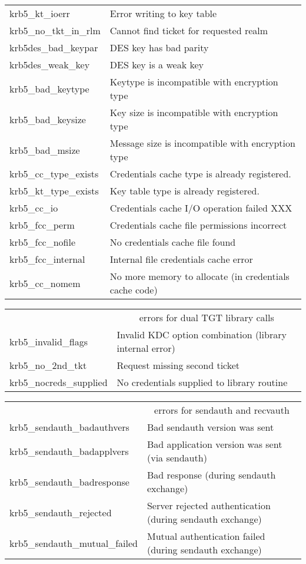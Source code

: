 \begin{small}
\begin{tabular}{ll}
{\sc krb5_kt_ioerr }&	 Error writing to key table \\
{\sc krb5_no_tkt_in_rlm }&	 Cannot find ticket for requested realm \\
{\sc krb5des_bad_keypar }&	 DES key has bad parity \\
{\sc krb5des_weak_key }&	 DES key is a weak key \\
{\sc krb5_bad_keytype }&	 Keytype is incompatible with encryption type \\
{\sc krb5_bad_keysize }&	 Key size is incompatible with encryption type \\
{\sc krb5_bad_msize }&	 Message size is incompatible with encryption type \\
{\sc krb5_cc_type_exists }&	 Credentials cache type is already registered. \\
{\sc krb5_kt_type_exists }&	 Key table type is already registered. \\
{\sc krb5_cc_io }&		 Credentials cache I/O operation failed XXX \\
{\sc krb5_fcc_perm }&	 Credentials cache file permissions incorrect \\
{\sc krb5_fcc_nofile }&	 No credentials cache file found \\
{\sc krb5_fcc_internal }&	 Internal file credentials cache error \\
{\sc krb5_cc_nomem }& No more memory to allocate (in credentials cache code) \\ 

\end{tabular}

\begin{tabular}{ll}
& \multicolumn{1}{c}{errors for dual TGT library calls} \\

{\sc krb5_invalid_flags }& Invalid KDC option combination (library internal error) \\
{\sc krb5_no_2nd_tkt }&	 Request missing second ticket \\
{\sc krb5_nocreds_supplied }& No credentials supplied to library routine \\

\end{tabular}

\begin{tabular}{ll}
& \multicolumn{1}{c}{errors for sendauth and recvauth} \\

{\sc krb5_sendauth_badauthvers }& Bad sendauth version was sent \\
{\sc krb5_sendauth_badapplvers }& Bad application version was sent (via sendauth) \\
{\sc krb5_sendauth_badresponse }& Bad response (during sendauth exchange) \\
{\sc krb5_sendauth_rejected }& Server rejected authentication (during sendauth exchange) \\
{\sc krb5_sendauth_mutual_failed }& Mutual authentication failed (during sendauth exchange) \\


\end{tabular}
\end{small}
